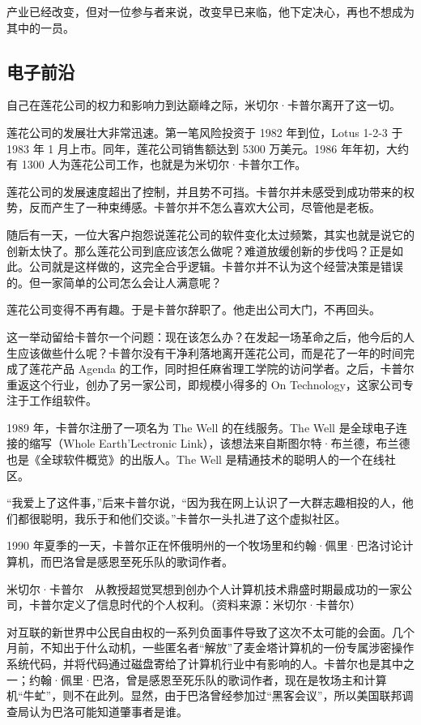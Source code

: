 \documentclass[12pt,UTF8]{ctexbook}
\begin{document}
产业已经改变，但对一位参与者来说，改变早已来临，他下定决心，再也不想成为其中的一员。





\subsection{电子前沿}


自己在莲花公司的权力和影响力到达巅峰之际，米切尔·卡普尔离开了这一切。

莲花公司的发展壮大非常迅速。第一笔风险投资于 1982 年到位，Lotus 1-2-3 于 1983 年 1 月上市。同年，莲花公司销售额达到 5300 万美元。1986 年年初，大约有 1300 人为莲花公司工作，也就是为米切尔·卡普尔工作。

莲花公司的发展速度超出了控制，并且势不可挡。卡普尔并未感受到成功带来的权势，反而产生了一种束缚感。卡普尔并不怎么喜欢大公司，尽管他是老板。

随后有一天，一位大客户抱怨说莲花公司的软件变化太过频繁，其实也就是说它的创新太快了。那么莲花公司到底应该怎么做呢？难道放缓创新的步伐吗？正是如此。公司就是这样做的，这完全合乎逻辑。卡普尔并不认为这个经营决策是错误的。但一家简单的公司怎么会让人满意呢？

莲花公司变得不再有趣。于是卡普尔辞职了。他走出公司大门，不再回头。

这一举动留给卡普尔一个问题：现在该怎么办？在发起一场革命之后，他今后的人生应该做些什么呢？卡普尔没有干净利落地离开莲花公司，而是花了一年的时间完成了莲花产品 Agenda 的工作，同时担任麻省理工学院的访问学者。之后，卡普尔重返这个行业，创办了另一家公司，即规模小得多的 On Technology，这家公司专注于工作组软件。

1989 年，卡普尔注册了一项名为 The Well 的在线服务。The Well 是全球电子连接的缩写（Whole Earth'Lectronic Link），该想法来自斯图尔特·布兰德，布兰德也是《全球软件概览》的出版人。The Well 是精通技术的聪明人的一个在线社区。

“我爱上了这件事，”后来卡普尔说，“因为我在网上认识了一大群志趣相投的人，他们都很聪明，我乐于和他们交谈。”卡普尔一头扎进了这个虚拟社区。

1990 年夏季的一天，卡普尔正在怀俄明州的一个牧场里和约翰·佩里·巴洛讨论计算机，而巴洛曾是感恩至死乐队的歌词作者。



米切尔·卡普尔　从教授超觉冥想到创办个人计算机技术鼎盛时期最成功的一家公司，卡普尔定义了信息时代的个人权利。（资料来源：米切尔·卡普尔）

对互联的新世界中公民自由权的一系列负面事件导致了这次不太可能的会面。几个月前，不知出于什么动机，一些匿名者“解放”了麦金塔计算机的一份专属涉密操作系统代码，并将代码通过磁盘寄给了计算机行业中有影响的人。卡普尔也是其中之一；约翰·佩里·巴洛，曾是感恩至死乐队的歌词作者，现在是牧场主和计算机“牛虻”，则不在此列。显然，由于巴洛曾经参加过“黑客会议”，所以美国联邦调查局认为巴洛可能知道肇事者是谁。
\end{document}
